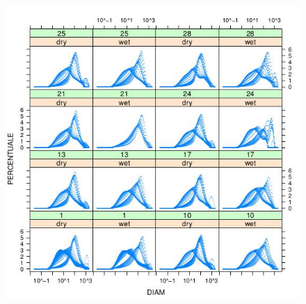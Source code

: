 \documentclass[10pt]{beamer}
\begin{document}
\begin{frame}
\begin{columns}
{\begin{figure}
        \includegraphics[width=\textwidth]{../foto/distropisa.jpeg}
      \end{figure}
    }
  \end{columns}  
\end{frame}
\end{document}
